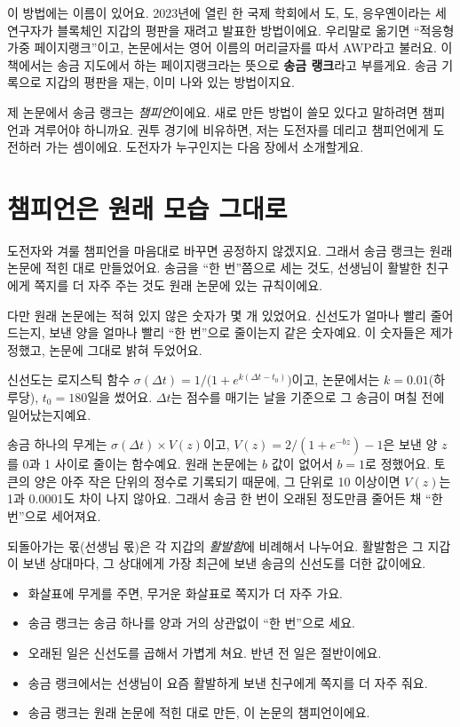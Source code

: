 이 방법에는 이름이 있어요.
2023년에 열린 한 국제 학회에서 도, 도, 응우옌이라는 세 연구자가 블록체인 지갑의 평판을 재려고 발표한 방법이에요.
우리말로 옮기면 “적응형 가중 페이지랭크”이고, 논문에서는 영어 이름의 머리글자를 따서 AWP라고 불러요.
이 책에서는 송금 지도에서 하는 페이지랭크라는 뜻으로 \textbf{송금 랭크}라고 부를게요.
송금 기록으로 지갑의 평판을 재는, 이미 나와 있는 방법이지요.

제 논문에서 송금 랭크는 \emph{챔피언}이에요.
새로 만든 방법이 쓸모 있다고 말하려면 챔피언과 겨루어야 하니까요.
권투 경기에 비유하면, 저는 도전자를 데리고 챔피언에게 도전하러 가는 셈이에요.
도전자가 누구인지는 다음 장에서 소개할게요.

\section{챔피언은 원래 모습 그대로}

도전자와 겨룰 챔피언을 마음대로 바꾸면 공정하지 않겠지요.
그래서 송금 랭크는 원래 논문에 적힌 대로 만들었어요.
송금을 “한 번”쯤으로 세는 것도, 선생님이 활발한 친구에게 쪽지를 더 자주 주는 것도 원래 논문에 있는 규칙이에요.

다만 원래 논문에는 적혀 있지 않은 숫자가 몇 개 있었어요.
신선도가 얼마나 빨리 줄어드는지, 보낸 양을 얼마나 빨리 “한 번”으로 줄이는지 같은 숫자예요.
이 숫자들은 제가 정했고, 논문에 그대로 밝혀 두었어요.

\begin{deeper}[송금 랭크의 식]
신선도는 로지스틱 함수 $\sigma(\Delta t) = 1/\bigl(1+e^{k(\Delta t - t_0)}\bigr)$이고,
논문에서는 $k=0.01$(하루당), $t_0=180$일을 썼어요.
$\Delta t$는 점수를 매기는 날을 기준으로 그 송금이 며칠 전에 일어났는지예요.

송금 하나의 무게는 $\sigma(\Delta t)\times V(z)$이고,
$V(z) = 2/(1+e^{-bz}) - 1$은 보낸 양 $z$를 0과 1 사이로 줄이는 함수예요.
원래 논문에는 $b$ 값이 없어서 $b=1$로 정했어요.
토큰의 양은 아주 작은 단위의 정수로 기록되기 때문에, 그 단위로 10 이상이면 $V(z)$는 1과 0.0001도 차이 나지 않아요.
그래서 송금 한 번이 오래된 정도만큼 줄어든 채 “한 번”으로 세어져요.

되돌아가는 몫(선생님 몫)은 각 지갑의 \emph{활발함}에 비례해서 나누어요.
활발함은 그 지갑이 보낸 상대마다, 그 상대에게 가장 최근에 보낸 송금의 신선도를 더한 값이에요.
\end{deeper}

\begin{learned}
\begin{itemize}
\item 화살표에 무게를 주면, 무거운 화살표로 쪽지가 더 자주 가요.
\item 송금 랭크는 송금 하나를 양과 거의 상관없이 “한 번”으로 세요.
\item 오래된 일은 신선도를 곱해서 가볍게 쳐요. 반년 전 일은 절반이에요.
\item 송금 랭크에서는 선생님이 요즘 활발하게 보낸 친구에게 쪽지를 더 자주 줘요.
\item 송금 랭크는 원래 논문에 적힌 대로 만든, 이 논문의 챔피언이에요.
\end{itemize}
\end{learned}
